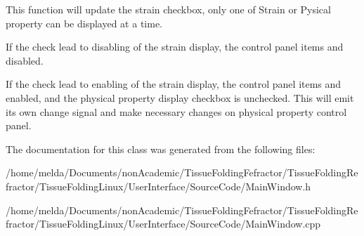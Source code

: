 This function will update the strain checkbox, only one of Strain or Pysical property can be displayed at a time. 

If the check lead to disabling of the strain display, the control panel items and disabled.

If the check lead to enabling of the strain display, the control panel items and enabled, and the physical property display checkbox is unchecked. This will emit its own change signal and make necessary changes on physical property control panel.

The documentation for this class was generated from the following files\+:\begin{DoxyCompactItemize}
\item 
/home/melda/\+Documents/non\+Academic/\+Tissue\+Folding\+Fefractor/\+Tissue\+Folding\+Refractor/\+Tissue\+Folding\+Linux/\+User\+Interface/\+Source\+Code/Main\+Window.\+h\item 
/home/melda/\+Documents/non\+Academic/\+Tissue\+Folding\+Fefractor/\+Tissue\+Folding\+Refractor/\+Tissue\+Folding\+Linux/\+User\+Interface/\+Source\+Code/Main\+Window.\+cpp\end{DoxyCompactItemize}
